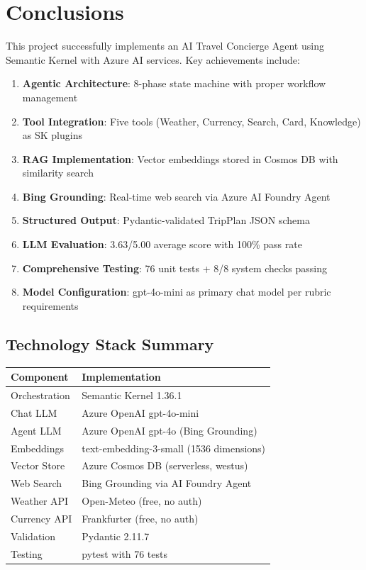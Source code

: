 \documentclass[11pt,a4paper]{article}
\begin{document}
\newpage

\section{Conclusions}

This project successfully implements an AI Travel Concierge Agent using Semantic Kernel with Azure AI services. Key achievements include:

\begin{enumerate}
    \item \textbf{Agentic Architecture}: 8-phase state machine with proper workflow management
    \item \textbf{Tool Integration}: Five tools (Weather, Currency, Search, Card, Knowledge) as SK plugins
    \item \textbf{RAG Implementation}: Vector embeddings stored in Cosmos DB with similarity search
    \item \textbf{Bing Grounding}: Real-time web search via Azure AI Foundry Agent
    \item \textbf{Structured Output}: Pydantic-validated TripPlan JSON schema
    \item \textbf{LLM Evaluation}: 3.63/5.00 average score with 100\% pass rate
    \item \textbf{Comprehensive Testing}: 76 unit tests + 8/8 system checks passing
    \item \textbf{Model Configuration}: gpt-4o-mini as primary chat model per rubric requirements
\end{enumerate}

\subsection{Technology Stack Summary}

\begin{table}[H]
\centering
\begin{tabular}{ll}
\toprule
\textbf{Component} & \textbf{Implementation} \\
\midrule
Orchestration & Semantic Kernel 1.36.1 \\
Chat LLM & Azure OpenAI gpt-4o-mini \\
Agent LLM & Azure OpenAI gpt-4o (Bing Grounding) \\
Embeddings & text-embedding-3-small (1536 dimensions) \\
Vector Store & Azure Cosmos DB (serverless, westus) \\
Web Search & Bing Grounding via AI Foundry Agent \\
Weather API & Open-Meteo (free, no auth) \\
Currency API & Frankfurter (free, no auth) \\
Validation & Pydantic 2.11.7 \\
Testing & pytest with 76 tests \\
\bottomrule
\end{tabular}
\end{table}
\end{document}
